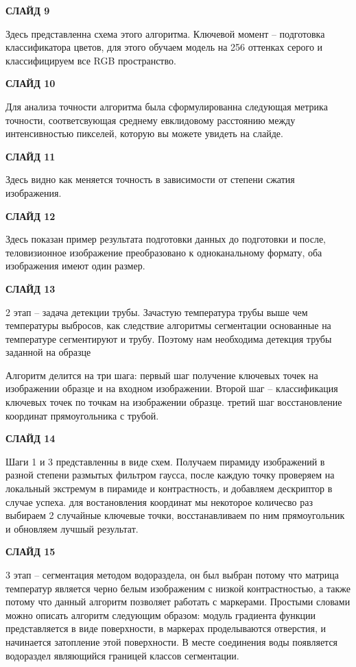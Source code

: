 \documentclass[14pt, a4paper]{extreport}
\begin{document}
	\textbf{СЛАЙД 9}
	
	Здесь представленна схема этого алгоритма. Ключевой момент -- подготовка классификатора цветов, для этого обучаем модель на 256 оттенках серого и классифицируем все RGB пространство. 
	
	\textbf{СЛАЙД 10}
	
	Для анализа точности алгоритма была сформулированна следующая метрика точности, соответсвующая среднему евклидовому расстоянию между интенсивностью пикселей, которую вы можете увидеть на слайде. 
	
	\textbf{СЛАЙД 11}
	
	Здесь видно как меняется точность в зависимости от степени сжатия изображения.
	
	\textbf{СЛАЙД 12}
	
	Здесь показан пример результата подготовки данных до подготовки и после, теловизионное изображение преобразовано к одноканальному формату, оба изображения имеют один размер.
	
	\textbf{СЛАЙД 13}
	
	2 этап -- задача детекции трубы. Зачастую температура трубы выше чем температуры выбросов, как следствие алгоритмы сегментации основанные на температуре сегментируют и трубу. Поэтому нам необходима детекция трубы заданной на образце
	
	 Алгоритм делится на три шага: первый шаг получение ключевых точек на изображении образце и на входном изображении. Второй шаг -- классификация ключевых точек по точкам на изображении образце. третий шаг восстановление координат прямоугольника с трубой. 
	 
	 \textbf{СЛАЙД 14}
	 
	 Шаги 1 и 3 представленны в виде схем. Получаем пирамиду изображений в разной степени размытых фильтром гаусса, после каждую точку проверяем на локальный экстремум в пирамиде и контрастность, и добавляем дескриптор в случае успеха.
	 для востановления координат мы некоторое количесво раз выбираем 2 случайные ключевые точки, восстанавливаем по ним прямоугольник и обновляем лучшый результат.
	 
	 \textbf{СЛАЙД 15}
	 
 	3 этап -- сегментация методом водораздела, он был выбран потому что матрица температур является черно белым изображеним с низкой контрастностью, а также потому что данный алгоритм позволяет работать с маркерами. Простыми словами можно описать алгоритм следующим образом: модуль градиента функции представляется в виде поверхности, в маркерах проделываются отверстия, и начинается затопление этой поверхности. В месте соединения воды появляется водораздел являющийся границей классов сегментации.
	 
\end{document}
